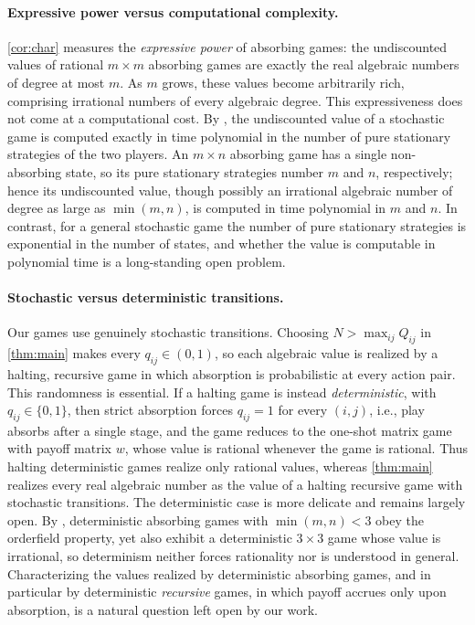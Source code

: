 \documentclass[11pt, a4paper]{article}
\theoremstyle{plain}
\theoremstyle{definition}
\begin{document}
\paragraph{Expressive power versus computational complexity.}
\cref{cor:char} measures the \emph{expressive power} of absorbing games: the undiscounted values of rational $m\times m$ absorbing games are exactly the real algebraic numbers of degree at most $m$. As $m$ grows, these values become arbitrarily rich, comprising irrational numbers of every algebraic degree.
This expressiveness does not come at a computational cost. By \citet{OB21}, the undiscounted value of a stochastic game is computed exactly in time polynomial in the number of pure stationary strategies of the two players. An $m\times n$ absorbing game has a single non-absorbing state, so its pure stationary strategies number $m$ and $n$, respectively; hence its undiscounted value, though possibly an irrational algebraic number of degree as large as $\min(m, n)$, is computed in time polynomial in $m$ and $n$. In contrast, for a general stochastic game the number of pure stationary strategies is exponential in the number of states, and whether the value is computable in polynomial time is a long-standing open problem.

\paragraph{Stochastic versus deterministic transitions.}
Our games use genuinely stochastic transitions. Choosing $N>\max_{ij}Q_{ij}$ in \cref{thm:main} makes every $q_{ij}\in(0,1)$, so each algebraic value is realized by a halting, recursive game in which absorption is probabilistic at every action pair. This randomness is essential. If a halting game is instead \emph{deterministic}, with $q_{ij}\in\{0,1\}$, then strict absorption forces $q_{ij}=1$ for every $(i,j)$, i.e., play absorbs after a single stage, and the game reduces to the one-shot matrix game with payoff matrix $w$, whose value is rational whenever the game is rational. Thus halting deterministic games realize only rational values, whereas \cref{thm:main} realizes every real algebraic number as the value of a halting recursive game with stochastic transitions.
The deterministic case is more delicate and remains largely open. By \citet[Theorem~1]{OV23}, deterministic absorbing games with $\min(m,n)<3$ obey the orderfield property, yet \citet{OV23} also exhibit a deterministic $3\times3$ game whose value is irrational, so determinism neither forces rationality nor is understood in general. Characterizing the values realized by deterministic absorbing games, and in particular by deterministic \emph{recursive} games, in which payoff accrues only upon absorption, is a natural question left open by our work.
\end{document}

